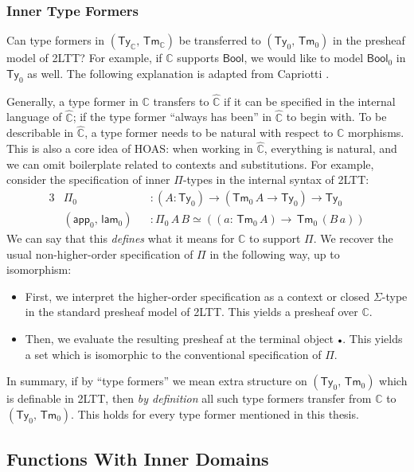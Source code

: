 \documentclass[12pt,a4paper,twoside,openany]{book}
\theoremstyle{remark}
\theoremstyle{definition}
\theoremstyle{theorem}
\newcommand{\ms}[1]{\mathsf{#1}}
\newcommand{\mbb}[1]{\mathbb{#1}}
\newcommand{\Tm}{\mathsf{Tm}}
\newcommand{\Ty}{\mathsf{Ty}}
\newcommand{\emptycon}{\scaleobj{.75}\bullet}
\newcommand{\app}{\ms{app}}
\newcommand{\Bool}{\ms{Bool}}
\newcommand{\mbbC}{\mbb{C}}
\newcommand{\hmbbC}{\hat{\mbb{C}}}
\newcommand{\lam}{\ms{lam}}
\begin{document}
\subsubsection{Inner Type Formers}

Can type formers in $(\Ty_{\mbbC},\,\Tm_{\mbbC})$ be transferred to
$(\Ty_0,\,\Tm_0)$ in the presheaf model of 2LTT? For example, if $\mbbC$
supports $\Bool$, we would like to model $\Bool_0$ in $\Ty_0$ as well. The
following explanation is adapted from Capriotti \cite[Section
  2.3]{capriotti2017models}.

Generally, a type former in $\mbbC$ transfers to $\hmbbC$ if it can be specified
in the internal language of $\hmbbC$; if the type former ``always has been'' in
$\hmbbC$ to begin with. To be describable in $\hmbbC$, a type former needs to be
natural with respect to $\mbbC$ morphisms. This is also a core idea of HOAS:
when working in $\hmbbC$, everything is natural, and we can omit boilerplate
related to contexts and substitutions. For example, consider the specification
of inner $\Pi$-types in the internal syntax of 2LTT:
\begin{alignat*}{3}
  &\Pi_0             &&: (A : \Ty_0) \to (\Tm_0\,A \to \Ty_0) \to \Ty_0\\
  &(\app_0,\,\lam_0) &&: \Pi_0\,A\,B \simeq ((a :\,\Tm_0\,A) \to \,\Tm_0\,(B\,a))
\end{alignat*}
We can say that this \emph{defines} what it means for $\mbbC$ to support
$\Pi$. We recover the usual non-higher-order specification of $\Pi$ in the
following way, up to isomorphism:
\begin{itemize}
\item First, we interpret the higher-order specification as a context or closed $\Sigma$-type
      in the standard presheaf model of 2LTT. This yields a presheaf over $\mbbC$.
\item Then, we evaluate the resulting presheaf at the terminal object
      $\emptycon$. This yields a set which is isomorphic to the conventional
      specification of $\Pi$.
\end{itemize}

In summary, if by ``type formers'' we mean extra structure on $(\Ty_0,\,\Tm_0)$
which is definable in 2LTT, then \emph{by definition} all such type formers
transfer from $\mbbC$ to $(\Ty_0,\,\Tm_0)$. This holds for every type former
mentioned in this thesis.

\subsection{Functions With Inner Domains}
\end{document}
